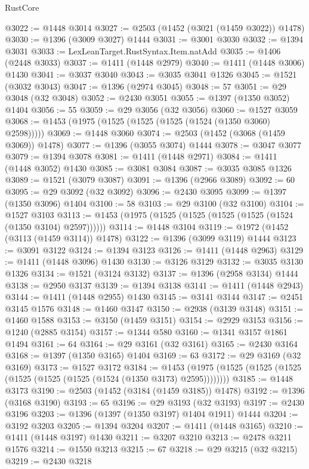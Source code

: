 \begin{lexlean}{RustCore}
\begin{coremodule}
@3022 := @1448 @3014
@3027 := @2503 (@1452 (@3021 (@1459 @3022)) @1478)
@3030 := @1396 (@3009 @3027) @1444
@3031 := @3001 @3030
@3032 := @1394 @3031
@3033 := LexLeanTarget.RustSyntax.Item.natAdd
@3035 := @1406 (@2448 @3033)
@3037 := @1411 (@1448 @2979)
@3040 := @1411 (@1448 @3006) @1430
@3041 := @3037 @3040
@3043 := @3035 @3041 @1326
@3045 := @1521 (@3032 @3043)
@3047 := @1396 (@2974 @3045)
@3048 := 57
@3051 := @29 @3048 (@32 @3048)
@3052 := @2430 @3051
@3055 := @1397 (@1350 @3052) @1404
@3056 := 55
@3059 := @29 @3056 (@32 @3056)
@3060 := @1527 @3059
@3068 := @1453 (@1975 (@1525 (@1525 (@1525 (@1524 (@1350 @3060) @2598)))))
@3069 := @1448 @3060
@3074 := @2503 (@1452 (@3068 (@1459 @3069)) @1478)
@3077 := @1396 (@3055 @3074) @1444
@3078 := @3047 @3077
@3079 := @1394 @3078
@3081 := @1411 (@1448 @2971)
@3084 := @1411 (@1448 @3052) @1430
@3085 := @3081 @3084
@3087 := @3035 @3085 @1326
@3089 := @1521 (@3079 @3087)
@3091 := @1396 (@2966 @3089)
@3092 := 60
@3095 := @29 @3092 (@32 @3092)
@3096 := @2430 @3095
@3099 := @1397 (@1350 @3096) @1404
@3100 := 58
@3103 := @29 @3100 (@32 @3100)
@3104 := @1527 @3103
@3113 := @1453 (@1975 (@1525 (@1525 (@1525 (@1525 (@1524 (@1350 @3104) @2597))))))
@3114 := @1448 @3104
@3119 := @1972 (@1452 (@3113 (@1459 @3114)) @1478)
@3122 := @1396 (@3099 @3119) @1444
@3123 := @3091 @3122
@3124 := @1394 @3123
@3126 := @1411 (@1448 @2963)
@3129 := @1411 (@1448 @3096) @1430
@3130 := @3126 @3129
@3132 := @3035 @3130 @1326
@3134 := @1521 (@3124 @3132)
@3137 := @1396 (@2958 @3134) @1444
@3138 := @2950 @3137
@3139 := @1394 @3138
@3141 := @1411 (@1448 @2943)
@3144 := @1411 (@1448 @2955) @1430
@3145 := @3141 @3144
@3147 := @2451 @3145 @1576
@3148 := @1460 @3147
@3150 := @2938 (@3139 @3148)
@3151 := @1460 @1588
@3153 := @3150 (@1459 @3151)
@3154 := @2929 @3153
@3156 := @1240 (@2885 @3154)
@3157 := @1344 @580
@3160 := @1341 @3157 @1861 @1494
@3161 := 64
@3164 := @29 @3161 (@32 @3161)
@3165 := @2430 @3164
@3168 := @1397 (@1350 @3165) @1404
@3169 := 63
@3172 := @29 @3169 (@32 @3169)
@3173 := @1527 @3172
@3184 := @1453 (@1975 (@1525 (@1525 (@1525 (@1525 (@1525 (@1525 (@1524 (@1350 @3173) @2595))))))))
@3185 := @1448 @3173
@3190 := @2503 (@1452 (@3184 (@1459 @3185)) @1478)
@3192 := @1396 (@3168 @3190)
@3193 := 65
@3196 := @29 @3193 (@32 @3193)
@3197 := @2430 @3196
@3203 := @1396 (@1397 (@1350 @3197) @1404 @1911) @1444
@3204 := @3192 @3203
@3205 := @1394 @3204
@3207 := @1411 (@1448 @3165)
@3210 := @1411 (@1448 @3197) @1430
@3211 := @3207 @3210
@3213 := @2478 @3211 @1576
@3214 := @1550 @3213
@3215 := 67
@3218 := @29 @3215 (@32 @3215)
@3219 := @2430 @3218

\end{coremodule}
\end{lexlean}
